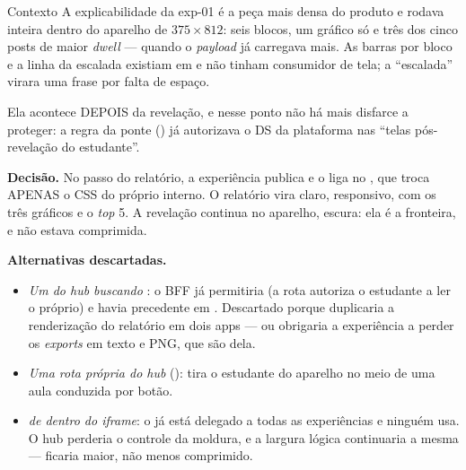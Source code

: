 \begin{especificacao}{Contexto}
A explicabilidade da exp-01 é a peça mais densa do produto e rodava inteira
dentro do aparelho de $375\times812$: seis blocos, um gráfico só e três dos cinco
posts de maior \emph{dwell} --- quando o \emph{payload} já carregava mais. As
barras por bloco e a linha da escalada existiam em  e não
tinham consumidor de tela; a ``escalada'' virara uma frase por falta de espaço.

Ela acontece DEPOIS da revelação, e nesse ponto não há mais disfarce a proteger:
a regra da ponte () já autorizava o DS da plataforma
nas ``telas pós-revelação do estudante''.
\end{especificacao}

\textbf{Decisão.} No passo do relatório, a experiência publica
 e o
 liga  no , que troca APENAS o
CSS do próprio  interno. O relatório vira claro, responsivo, com os
três gráficos e o \emph{top} 5. A revelação continua no aparelho, escura: ela é
a fronteira, e não estava comprimida.

\textbf{Alternativas descartadas.}
\begin{itemize}
  \item \emph{Um  do hub buscando }:
    o BFF já permitiria (a rota autoriza o estudante a ler o próprio) e havia
    precedente em . Descartado porque duplicaria a
    renderização do relatório em dois apps --- ou obrigaria a experiência a
    perder os \emph{exports} em texto e PNG, que são dela.
  \item \emph{Uma rota própria do hub} (): tira o
    estudante do aparelho no meio de uma aula conduzida por botão.
  \item \emph{ de dentro do \emph{iframe}}: o
     já está delegado a todas as experiências e
    ninguém usa. O hub perderia o controle da moldura, e a largura lógica
    continuaria a mesma --- ficaria maior, não menos comprimido.
\end{itemize}

